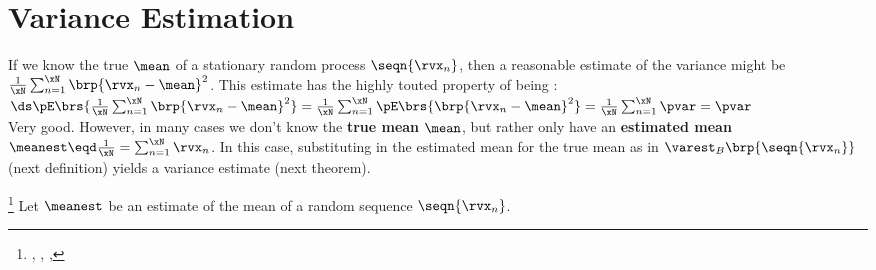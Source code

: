 \section{Variance Estimation}
If we know the true  $\mean$ of a stationary random process $\seqn{\rvx_n}$,
then a reasonable estimate of the variance might be
$\frac{1}{\xN}\sum_{n=1}^{\xN} \brp{\rvx_n-\mean}^2$.
This estimate has the highly touted property of being :
\\\indentx$\ds
 \pE\brs{\frac{1}{\xN}\sum_{n=1}^{\xN} \brp{\rvx_n-\mean}^2}
   =     \frac{1}{\xN}\sum_{n=1}^{\xN} \pE\brs{\brp{\rvx_n-\mean}^2}
   =     \frac{1}{\xN}\sum_{n=1}^{\xN} \pvar
   =     \pvar
$\\
Very good.
However, in many cases we don't know the \textbf{true mean} $\mean$,
but rather only have an \textbf{estimated mean} $\meanest\eqd\frac{1}{\xN}=\sum_{n=1}^{\xN}\rvx_n$.
In this case, substituting in the estimated mean for the true mean as in
$\varest_B\brp{\seqn{\rvx_n}}$ (next definition) yields a  variance estimate (next theorem).

\begin{definition}
\footnote{
  ,
  ,
  ,
  }
\label{def:varest}
Let $\meanest$ be an estimate of the mean of a random sequence $\seqn{\rvx_n}$.
\end{definition}

